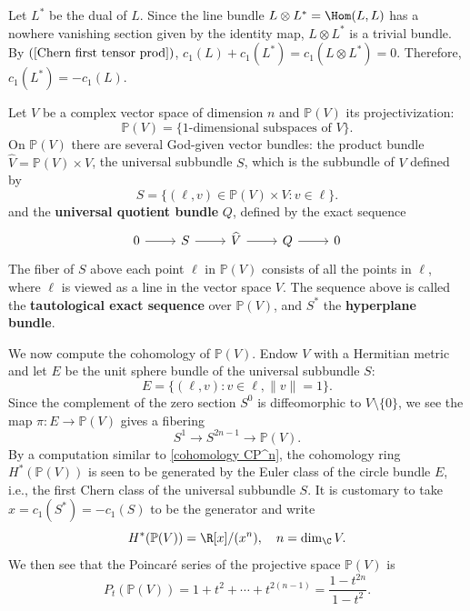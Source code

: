 Let $L^*$ be the dual of $L$. Since the line bundle $L\otimes L^*=\Hom(L,L)$ has a nowhere vanishing section given by the identity map, $L\otimes L^*$ is a trivial 
bundle. By $(\ref{Chern first tensor prod})$, $c_1(L)+c_1(L^*)=c_1(L\otimes L^*)=0$. Therefore, $c_1(L^*)=-c_1(L)$.
\begin{example}
Let $V$ be a complex vector space of dimension $n$ and $\mathbb{P}(V)$ its projectivization:
\[\mathbb{P}(V)=\{\text{$1$-dimensional subspaces of $V$}\}.\]
On $\mathbb{P}(V)$ there are several God-given vector bundles: the product bundle $\widehat{V}=\mathbb{P}(V)\times V$, the universal subbundle $S$, which is the 
subbundle of $V$ defined by
\[S=\{(\ell,v)\in\mathbb{P}(V)\times V:v\in\ell\}.\]
and the \textbf{universal quotient bundle} $Q$, defined by the exact sequence
\[\begin{tikzcd}
0\ar[r]&S\ar[r]&\widehat{V}\ar[r]&Q\ar[r]&0
\end{tikzcd}\]
The fiber of $S$ above each point $\ell$ in $\mathbb{P}(V)$ consists of all the points in $\ell$, where $\ell$ is viewed as a line in the vector space $V$. The sequence above 
is called the \textbf{tautological exact sequence} over $\mathbb{P}(V)$, and $S^*$ the \textbf{hyperplane bundle}.\par
We now compute the cohomology of $\mathbb{P}(V)$. Endow $V$ with a Hermitian metric and let $E$ be the unit sphere bundle of the universal subbundle $S$:
\[E=\{(\ell,v):v\in\ell,\|v\|=1\}.\]
Since the complement of the zero section $S^0$ is diffeomorphic to $V\setminus\{0\}$, we see the map $\pi:E\to\mathbb{P}(V)$ gives a fibering
\[S^1\to S^{2n-1}\to \mathbb{P}(V).\]
By a computation similar to \cref{cohomology CP^n}, the cohomology ring $H^*(\mathbb{P}(V))$ is seen to be generated by the Euler class of the circle bundle $E$, i.e., the first Chern class 
of the universal subbundle $S$. It is customary to take $x=c_1(S^*)=-c_1(S)$ to be the generator and write
\[H^*(\mathbb{P}(V))=\R[x]/(x^n),\quad n=\dim_\C V.\]
We then see that the Poincar\'e series of the projective space $\mathbb{P}(V)$ is
\[P_t(\mathbb{P}(V))=1+t^2+\cdots+t^{2(n-1)}=\frac{1-t^{2n}}{1-t^2}.\]
\end{example}
